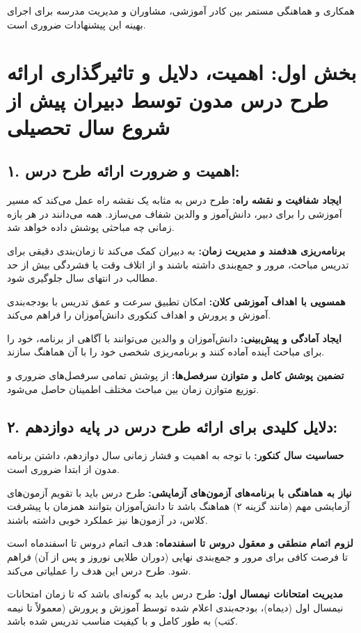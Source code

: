 \documentclass[a4paper]{article}
\begin{document}
\medskip

همکاری و هماهنگی مستمر بین کادر آموزشی، مشاوران و مدیریت مدرسه برای اجرای بهینه این پیشنهادات ضروری است.
\newpage
\section*{بخش اول: اهمیت، دلایل و تاثیرگذاری ارائه طرح درس مدون توسط دبیران پیش از شروع سال تحصیلی}
\bigskip

\subsection*{۱. اهمیت و ضرورت ارائه طرح درس:}
\textbf{ایجاد شفافیت و نقشه راه:} طرح درس به مثابه یک نقشه راه عمل می‌کند که مسیر آموزشی را برای دبیر، دانش‌آموز و والدین شفاف می‌سازد. همه می‌دانند در هر بازه زمانی چه مباحثی پوشش داده خواهد شد.

\textbf{برنامه‌ریزی هدفمند و مدیریت زمان:} به دبیران کمک می‌کند تا زمان‌بندی دقیقی برای تدریس مباحث، مرور و جمع‌بندی داشته باشند و از اتلاف وقت یا فشردگی بیش از حد مطالب در انتهای سال جلوگیری شود.

\textbf{همسویی با اهداف آموزشی کلان:} امکان تطبیق سرعت و عمق تدریس با بودجه‌بندی آموزش و پرورش و اهداف کنکوری دانش‌آموزان را فراهم می‌کند.

\textbf{ایجاد آمادگی و پیش‌بینی:} دانش‌آموزان و والدین می‌توانند با آگاهی از برنامه، خود را برای مباحث آینده آماده کنند و برنامه‌ریزی شخصی خود را با آن هماهنگ سازند.

\textbf{تضمین پوشش کامل و متوازن سرفصل‌ها:} از پوشش تمامی سرفصل‌های ضروری و توزیع متوازن زمان بین مباحث مختلف اطمینان حاصل می‌شود.
\medskip

\subsection*{۲. دلایل کلیدی برای ارائه طرح درس در پایه دوازدهم:}
\textbf{حساسیت سال کنکور:} با توجه به اهمیت و فشار زمانی سال دوازدهم، داشتن برنامه مدون از ابتدا ضروری است.

\textbf{نیاز به هماهنگی با برنامه‌های آزمون‌های آزمایشی:} طرح درس باید با تقویم آزمون‌های آزمایشی مهم (مانند گزینه ۲) هماهنگ باشد تا دانش‌آموزان بتوانند همزمان با پیشرفت کلاس، در آزمون‌ها نیز عملکرد خوبی داشته باشند.

\textbf{لزوم اتمام منطقی و معقول دروس تا اسفندماه:}  هدف اتمام دروس تا اسفندماه است تا فرصت کافی برای مرور و جمع‌بندی نهایی (دوران طلایی نوروز و پس از آن) فراهم شود. طرح درس این هدف را عملیاتی می‌کند.

\textbf{مدیریت امتحانات نیمسال اول:} طرح درس باید به گونه‌ای باشد که تا زمان امتحانات نیمسال اول (دیماه)، بودجه‌بندی اعلام شده توسط آموزش و پرورش (معمولاً تا نیمه کتب) به طور کامل و با کیفیت مناسب تدریس شده باشد.
\medskip
\end{document}
